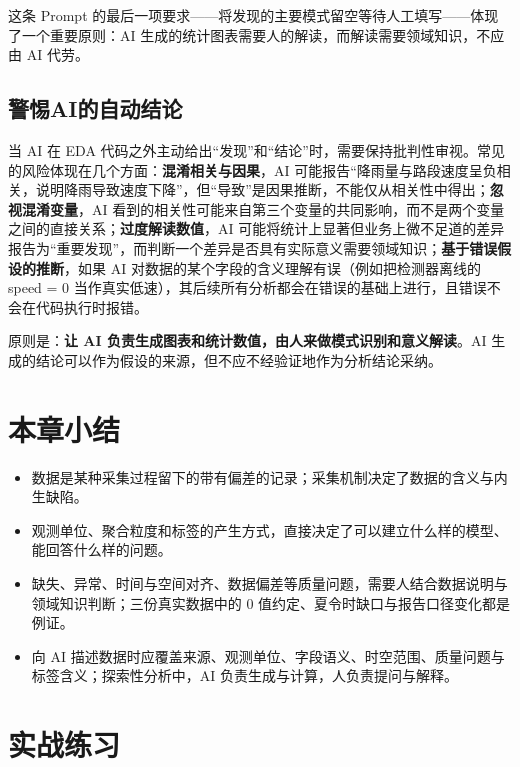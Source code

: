 这条 Prompt 的最后一项要求——将发现的主要模式留空等待人工填写——体现了一个重要原则：AI 生成的统计图表需要人的解读，而解读需要领域知识，不应由 AI 代劳。

\subsection{警惕AI的自动结论}

当 AI 在 EDA 代码之外主动给出“发现”和“结论”时，需要保持批判性审视。常见的风险体现在几个方面：\textbf{混淆相关与因果}，AI 可能报告“降雨量与路段速度呈负相关，说明降雨导致速度下降”，但“导致”是因果推断，不能仅从相关性中得出；\textbf{忽视混淆变量}，AI 看到的相关性可能来自第三个变量的共同影响，而不是两个变量之间的直接关系；\textbf{过度解读数值}，AI 可能将统计上显著但业务上微不足道的差异报告为“重要发现”，而判断一个差异是否具有实际意义需要领域知识；\textbf{基于错误假设的推断}，如果 AI 对数据的某个字段的含义理解有误（例如把检测器离线的 speed = 0 当作真实低速），其后续所有分析都会在错误的基础上进行，且错误不会在代码执行时报错。

原则是：\textbf{让 AI 负责生成图表和统计数值，由人来做模式识别和意义解读}。AI 生成的结论可以作为假设的来源，但不应不经验证地作为分析结论采纳。

\section{本章小结}

\begin{itemize}
  \item 数据是某种采集过程留下的带有偏差的记录；采集机制决定了数据的含义与内生缺陷。
  \item 观测单位、聚合粒度和标签的产生方式，直接决定了可以建立什么样的模型、能回答什么样的问题。
  \item 缺失、异常、时间与空间对齐、数据偏差等质量问题，需要人结合数据说明与领域知识判断；三份真实数据中的 0 值约定、夏令时缺口与报告口径变化都是例证。
  \item 向 AI 描述数据时应覆盖来源、观测单位、字段语义、时空范围、质量问题与标签含义；探索性分析中，AI 负责生成与计算，人负责提问与解释。
\end{itemize}

\section{实战练习}

